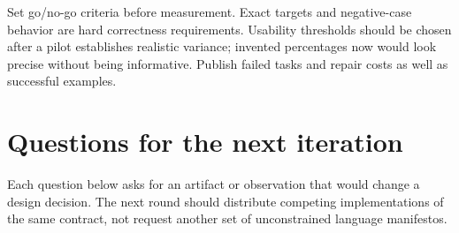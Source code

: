 \documentclass[11pt,letterpaper]{article}
\begin{document}
Set go/no-go criteria before measurement. Exact targets and negative-case behavior
are hard correctness requirements. Usability thresholds should be chosen after
a pilot establishes realistic variance; invented percentages now would look
precise without being informative. Publish failed tasks and repair costs as well
as successful examples.

\section{Questions for the next iteration}\label{sec:questions}
Each question below asks for an artifact or observation that would change a design
decision. The next round should distribute competing implementations of the same
contract, not request another set of unconstrained language manifestos.
\end{document}
